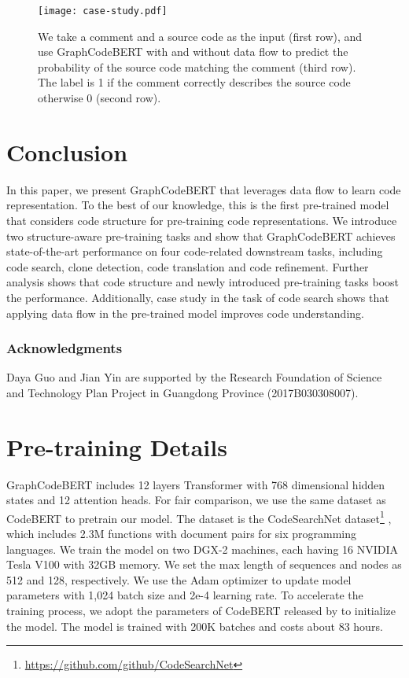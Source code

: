 \documentclass{article} \usepackage{iclr2021_conference,times}
\begin{document}
\begin{figure}[h]
\begin{center}
		\texttt{[image: case-study.pdf]}
		\caption{We take a comment and a source code as the input (first row), and use GraphCodeBERT with and without data flow to predict the probability of the source code matching the comment (third row). The label is 1 if the comment correctly describes the source code otherwise 0 (second row). }
		\label{case-study}
	\end{center}
\end{figure}

\section{Conclusion}
In this paper, we present GraphCodeBERT that leverages data flow to learn code representation. To the best of our knowledge, this is the first pre-trained model that considers code structure for pre-training code representations. We introduce two structure-aware pre-training tasks and show that GraphCodeBERT achieves state-of-the-art performance on four code-related downstream tasks, including code search, clone detection, code translation and code refinement.
Further analysis shows that code structure and newly introduced pre-training tasks boost the performance. Additionally, case study in the task of code search shows that applying data flow in the pre-trained model improves code understanding.

\subsubsection*{Acknowledgments}
Daya Guo and Jian Yin are supported by the Research Foundation of Science and Technology Plan Project in Guangdong Province (2017B030308007).




\appendix
\section{Pre-training Details}
GraphCodeBERT includes 12 layers Transformer with 768 dimensional hidden states and 12 attention heads. 
For fair comparison, we use the same dataset as CodeBERT \citep{feng2020codebert} to pretrain our model. The dataset is the CodeSearchNet dataset\footnote{\url{https://github.com/github/CodeSearchNet}}  \citep{husain2019codesearchnet}, which includes 2.3M functions with document pairs for six programming languages. 
We train the model on two DGX-2 machines, each having 16 NVIDIA Tesla V100 with 32GB memory. We set the max length of sequences and nodes as 512 and 128, respectively. We use the Adam optimizer to update model parameters with 1,024 batch size and 2e-4 learning rate. To accelerate
the training process, we adopt the parameters of
CodeBERT released by \cite{feng2020codebert} to initialize the model. The model is trained with 200K batches and costs about 83 hours.
\end{document}
